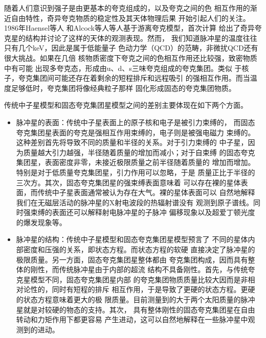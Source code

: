 随着人们意识到强子是由更基本的夸克组成的，以及夸克之间的色
相互作用的渐近自由特性，奇异夸克物质的稳定性及其天体物理后果
开始引起人们的关注\supercite{wit84}。1986年Haensel等人\supercite{hzs86}
和Alcock等人\supercite{afo86}等人基于游离夸克模型，首次计算
给出了奇异夸克星的结构并讨论了这样的天体的观测表现。然而，
我们知道脉冲星的温度往往只有几个keV，因此是属于低能量子
色动力学（QCD）的范畴，非微扰QCD还有很大挑战。如果在几倍
核物质密度下夸克之间的色相互作用还比较强，致密物质中有可能
出现多夸克态，形成由u、d、s三味夸克组成的夸克集团。类似
于核子，夸克集团间可能还存在着剩余的短程排斥和远程吸引
的强相互作用。而当温度足够低时，夸克集团将像经典粒子那样
固化形成固态的夸克集团物质。

传统中子星模型和固态夸克集团星模型之间的差别主要体现在如下两个方面。
\begin{itemize}
\item 脉冲星的表面：传统中子星表面上的原子核和电子是被引力束缚的，
而固态夸克集团星表面的夸克是强相互作用束缚的，电子则是被强电磁力
束缚的。这种差别首先将导致不同的质量和半径的关系。对于引力束缚的
中子星，因为质量越大引力越强，半径随着质量的增加而减小；对于自束缚
的固态夸克集团星，表面密度非零，未接近极限质量之前半径随着质量的
增加而增加。特别是对于低质量夸克集团星，引力作用可以忽略，于是
质量正比于半径的三次方。其次，固态夸克集团星的强束缚表面意味着
可以存在裸的星体表面，而传统中子星表面通常被认为存在大气。裸的星体表面可以
自然地解释我们在无磁层活动的脉冲星的X射电波段的热辐射谱没有
观测到原子谱线。同时强束缚的表面还可以解释射电脉冲星的子脉冲
偏移现象以及超爱丁顿光度的爆发现象等。
\item 脉冲星的结构：传统中子星模型和固态夸克集团星模型预言了
不同的星体内部密度和压强的关系，即状态方程。而状态方程的软硬
直接决定了脉冲星的极限质量。另一方面，固态夸克集团星整体都由
夸克集团构成，因而具有整体的刚性，而传统脉冲星由于内部的超流
结构不具备刚性。首先，与传统夸克星模型不同，固态夸克集团星内部
的夸克集团物质质量比较大因而是非相对论性的，同时有短程的排斥
相互作用，于是导致了更硬的状态方程。更硬的状态方程意味着更大的极
限质量。目前测量到的大于两个太阳质量的脉冲星就是对较硬的物态的支持。其次，
具有整体刚性的固态夸克集团星在自由转动和力矩作用下都更容易
产生进动，这可以自然地解释在一些脉冲星中观测到的进动。
\end{itemize}

